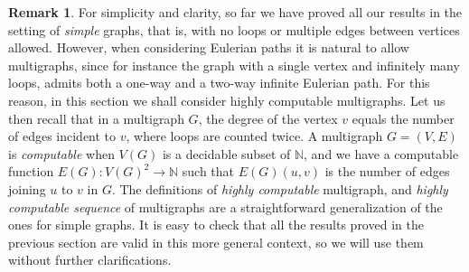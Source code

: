 \documentclass[10pt,A4]{amsart}
\theoremstyle{definition}
\theoremstyle{definition}
\newtheorem{remark}{Remark}
\newcommand{\N}{\mathbb{N}}
\newcommand{\HP}{\operatorname{\mathbf{0}} '}
\begin{document}



\begin{remark}
    For simplicity and clarity, so far we have proved all our results in the setting of \emph{simple} graphs, that is, with no loops or multiple edges between vertices allowed. However, when considering Eulerian paths it is natural to allow multigraphs, since for instance the graph with a single vertex and infinitely many loops, admits both a one-way and a two-way infinite Eulerian path. For this reason, in this section we shall consider highly computable multigraphs. Let us then recall that in a multigraph $G$, the degree of the vertex $v$ equals the number of edges incident to $v$, where loops are counted twice. A multigraph $G=(V,E)$ is \emph{computable} when $V(G)$ is a decidable subset of $\N$, and we have a computable function $E(G)\colon V(G)^2\to \N$ such that $E(G)(u,v)$ is the number of edges joining $u$ to $v$ in $G$. The definitions of \emph{highly computable} multigraph, and \emph{highly computable sequence} of multigraphs are a straightforward generalization of the ones for simple graphs.  It is easy to check that all the results proved in the previous section are valid in this more general context, so we will use them without further clarifications.  
\end{remark}
\end{document}
